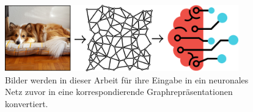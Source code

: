 \begin{figure}[t]
\centering
\includegraphics[width=0.9\textwidth]{bilder/problemstellung.png}
\caption[Problemstellung]{Bilder werden in dieser Arbeit für ihre Eingabe in ein neuronales Netz zuvor in eine korrespondierende Graphrepräsentationen konvertiert\protect\footnotemark.}
\label{fig:problemstellung}
\end{figure}
